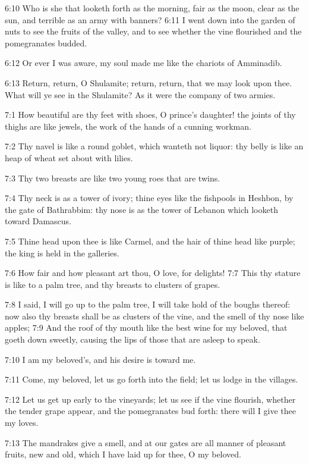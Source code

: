 6:10 Who is she that looketh forth as the morning, fair as the moon,
clear as the sun, and terrible as an army with banners?  6:11 I went
down into the garden of nuts to see the fruits of the valley, and to
see whether the vine flourished and the pomegranates budded.

6:12 Or ever I was aware, my soul made me like the chariots of
Amminadib.

6:13 Return, return, O Shulamite; return, return, that we may look
upon thee. What will ye see in the Shulamite? As it were the company
of two armies.

7:1 How beautiful are thy feet with shoes, O prince's daughter! the
joints of thy thighs are like jewels, the work of the hands of a
cunning workman.

7:2 Thy navel is like a round goblet, which wanteth not liquor: thy
belly is like an heap of wheat set about with lilies.

7:3 Thy two breasts are like two young roes that are twins.

7:4 Thy neck is as a tower of ivory; thine eyes like the fishpools in
Heshbon, by the gate of Bathrabbim: thy nose is as the tower of
Lebanon which looketh toward Damascus.

7:5 Thine head upon thee is like Carmel, and the hair of thine head
like purple; the king is held in the galleries.

7:6 How fair and how pleasant art thou, O love, for delights!  7:7
This thy stature is like to a palm tree, and thy breasts to clusters
of grapes.

7:8 I said, I will go up to the palm tree, I will take hold of the
boughs thereof: now also thy breasts shall be as clusters of the vine,
and the smell of thy nose like apples; 7:9 And the roof of thy mouth
like the best wine for my beloved, that goeth down sweetly, causing
the lips of those that are asleep to speak.

7:10 I am my beloved's, and his desire is toward me.

7:11 Come, my beloved, let us go forth into the field; let us lodge in
the villages.

7:12 Let us get up early to the vineyards; let us see if the vine
flourish, whether the tender grape appear, and the pomegranates bud
forth: there will I give thee my loves.

7:13 The mandrakes give a smell, and at our gates are all manner of
pleasant fruits, new and old, which I have laid up for thee, O my
beloved.

